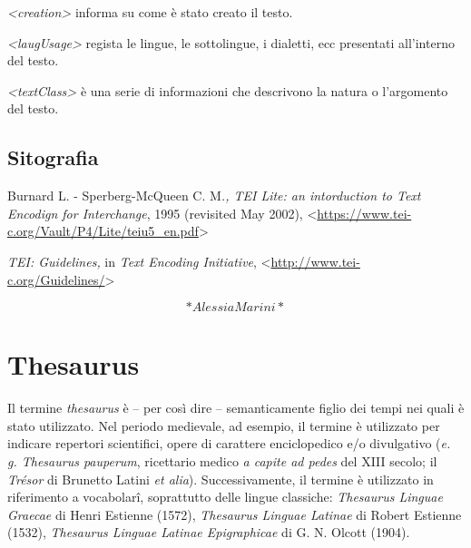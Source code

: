 \documentclass[
  b5paper,
  twoside,
  11pt,
  chapterprefix=false,
  bibliography=totocnumbered,
  listof=flat]{scrbook}
\begin{document}
\emph{\textless creation\textgreater{}} informa su come è stato creato il testo.

\emph{\textless laugUsage\textgreater{}} regista le lingue, le sottolingue, i dialetti, ecc
presentati all'interno del testo.

\emph{\textless textClass\textgreater{}} è una serie di informazioni che descrivono la natura o
l'argomento del testo.

\hypertarget{sitografia-28}{%
\section*{Sitografia}\label{sitografia-28}}

Burnard L. - Sperberg-McQueen C. M\emph{., TEI Lite: an intorduction to Text
Encodign for Interchange}, 1995 (revisited May 2002),
\textless{}\href{https://www.tei-c.org/Vault/P4/Lite/teiu5_en.pdf}{{https://www.tei-c.org/Vault/P4/Lite/teiu5\_en.pdf}}\textgreater{}

\emph{TEI: Guidelines,} in \emph{Text Encoding Initiative},
\textless{}\href{http://www.tei-c.org/Guidelines/}{{http://www.tei-c.org/Guidelines/}}\textgreater{}

\[*Alessia Marini*\]

\hypertarget{thesaurus}{%
\chapter{Thesaurus}\label{thesaurus}}

Il termine \emph{thesaurus} è -- per così dire -- semanticamente figlio dei
tempi nei quali è stato utilizzato. Nel periodo medievale, ad esempio,
il termine è utilizzato per indicare repertori scientifici, opere di
carattere enciclopedico e/o divulgativo (\emph{e. g. Thesaurus pauperum},
ricettario medico \emph{a capite ad pedes} del XIII secolo; il \emph{Trésor} di
Brunetto Latini \emph{et alia}). Successivamente, il termine è utilizzato in
riferimento a vocabolarî, soprattutto delle lingue classiche: \emph{Thesaurus
Linguae Graecae} di Henri Estienne (1572), \emph{Thesaurus Linguae Latinae}
di Robert Estienne (1532), \emph{Thesaurus Linguae Latinae Epigraphicae} di
G. N. Olcott (1904).
\end{document}
